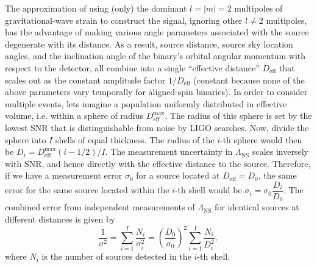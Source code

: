 \documentclass[aps,prd,amsmath,floats,floatfix, twocolumn,
superscriptaddress,nofootinbib,showpacs]{revtex4-1}
\newcommand{\lambdans}{\Lambda_\mathrm{NS}}
\newcommand{\deff}{D_\mathrm{eff}}
\begin{document}
The approximation of using (only) the dominant $l=|m|=2$ multipoles of
gravitational-wave strain to construct the signal, ignoring other $l\neq 2$
multipoles, has the advantage of making various angle parameters 
associated with the source degenerate with its distance. As a result, source
distance, source sky location angles, and the inclination angle of
the binary's orbital angular momentum with respect to the detector,
all combine into a single ``effective distance'' $\deff$ that scales
out as the constant amplitude factor $1/\deff$ (constant because none
of the above parameters vary temporally for aligned-spin binaries).
% 
In order to consider multiple events, lets imagine a population uniformly
distributed in effective volume, i.e. within a sphere of radius 
$\deff^\mathrm{max}$. The radius of this sphere is set by the lowest SNR that 
is distinguishable from noise by LIGO searches. Now, divide the sphere into
$I$ shells of equal thickness. The radius of the $i$-th sphere would then
be $D_i = \deff^\mathrm{max} (i - 1/2)/I$. The measurement uncertainty in
$\lambdans$ scales inversely with SNR, and hence directly with the 
effective distance to the source. Therefore, if we have a measurement error 
$\sigma_0$ for a source located at $\deff = D_0$, the same error for the same
source located within the $i$-th shell would be 
$\sigma_i = \sigma_0 \dfrac{D_i}{D_0}$. The combined error from independent
measurements of $\lambdans$ for identical sources at different distances is
given by
\begin{equation}\label{eq:1oversigma}
\frac{1}{\sigma^2} = \sum_{i=1}^I \frac{N_i}{\sigma_i^2} = \left(\frac{D_0}{\sigma_0}\right)^2 \sum_{i=1}^I\frac{N_i}{D_i^2},
\end{equation}
where $N_i$ is the number of sources detected in the $i$-th shell.
\end{document}
